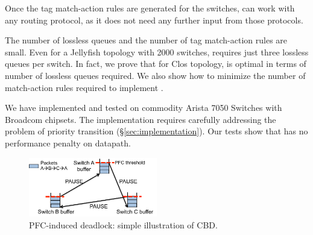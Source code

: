 Once the tag match-action rules are generated for the switches, \sysname{} can 
work with any routing protocol, as it does not need any further input from those protocols.

The number of lossless queues and the number of tag match-action rules are small. 
Even for a Jellyfish topology with 2000
switches, \sysname{} requires just three lossless queues per switch.  In fact,
we prove that for Clos topology,  \sysname{} is optimal in terms of number of
lossless queues required.  We also show how to minimize the number of
match-action rules required to implement \sysname{}.

We have implemented and tested \sysname{} on commodity Arista 7050 Switches with
Broadcom chipsets. The implementation requires carefully addressing the problem
of priority transition (\S\ref{sec:implementation}). Our tests show that
\sysname{} has no performance penalty on datapath.

\begin{figure}
	\centering
	\includegraphics[width=0.5\textwidth] {figs/deadlock}
	\vspace{-0.15in}
	\caption{PFC-induced deadlock: simple illustration of CBD.}
	\vspace{-0.15in}
	\label{fig:deadlock_example}
\end{figure}

